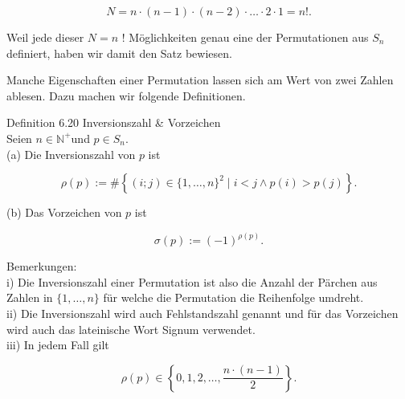 \documentclass[10pt]{article}
\begin{document}
\begin{equation*}
N=n \cdot(n-1) \cdot(n-2) \cdot \ldots \cdot 2 \cdot 1=n!. \tag{6.103}
\end{equation*}


Weil jede dieser $N=n$ ! Möglichkeiten genau eine der Permutationen aus $S_{n}$ definiert, haben wir damit den Satz bewiesen.

Manche Eigenschaften einer Permutation lassen sich am Wert von zwei Zahlen ablesen. Dazu machen wir folgende Definitionen.

Definition 6.20 Inversionszahl \& Vorzeichen\\
Seien $n \in \mathbb{N}^{+}$und $p \in S_{n}$.\\
(a) Die Inversionszahl von $p$ ist


\begin{equation*}
\rho(p):=\#\left\{(i ; j) \in\{1, \ldots, n\}^{2} \mid i<j \wedge p(i)>p(j)\right\} . \tag{6.104}
\end{equation*}


(b) Das Vorzeichen von $p$ ist


\begin{equation*}
\sigma(p):=(-1)^{\rho(p)} . \tag{6.105}
\end{equation*}


Bemerkungen:\\
i) Die Inversionszahl einer Permutation ist also die Anzahl der Pärchen aus Zahlen in $\{1, \ldots, n\}$ für welche die Permutation die Reihenfolge umdreht.\\
ii) Die Inversionszahl wird auch Fehlstandszahl genannt und für das Vorzeichen wird auch das lateinische Wort Signum verwendet.\\
iii) In jedem Fall gilt


\begin{equation*}
\rho(p) \in\left\{0,1,2, \ldots, \frac{n \cdot(n-1)}{2}\right\} . \tag{6.106}
\end{equation*}
\end{document}

